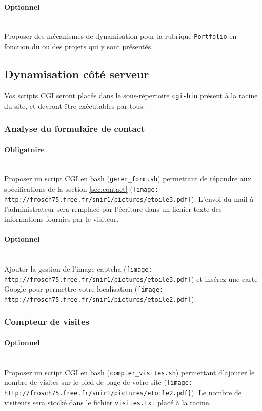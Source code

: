 \documentclass[a4paper,12pt]{article}
\newcommand\Code[1]{\textcolor{couleur_code}{\texttt{#1}}}
\begin{document}
\paragraph*{Optionnel}~\\
Proposer des mécanismes de dynamisation pour la rubrique \Code{Portfolio} 
en fonction du ou des projets qui y sont présentés.
\vspace{5pt}

\subsection{Dynamisation côté serveur}
Vos scripts CGI seront placés dans le sous-répertoire \Code{cgi-bin} présent 
à la racine du site, et devront être exécutables par tous. 

\subsubsection{Analyse du formulaire de contact}
\paragraph*{Obligatoire}~\\
Proposer un script CGI en bash (\Code{gerer\_form.sh}) permettant de répondre 
aux spécifications de la section \ref{sec:contact} 
(\texttt{[image: http://frosch75.free.fr/snir1/pictures/etoile3.pdf]}). 
L'envoi du mail à l'administrateur sera remplacé par l'écriture dans un fichier 
texte des informations fournies par le visiteur. 

\paragraph*{Optionnel}~\\
Ajouter la gestion de l'image captcha (\texttt{[image: http://frosch75.free.fr/snir1/pictures/etoile3.pdf]})
et insérez une carte Google pour permettre votre localisation   
(\texttt{[image: http://frosch75.free.fr/snir1/pictures/etoile2.pdf]}).

\subsubsection{Compteur de visites}
\paragraph*{Optionnel}~\\
Proposer un script CGI en bash (\Code{compter\_visites.sh}) permettant 
d'ajouter le nombre de visites sur le pied de page de votre site 
(\texttt{[image: http://frosch75.free.fr/snir1/pictures/etoile2.pdf]}). 
Le nombre de visiteurs sera stocké dans le fichier \Code{visites.txt} placé à la racine.
\vspace{5pt}
\end{document}
